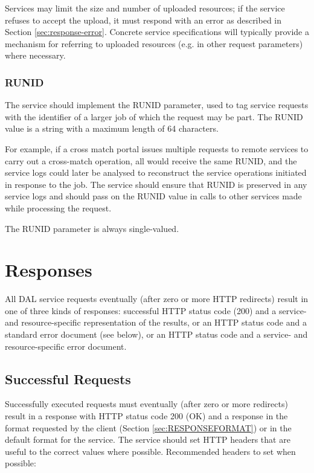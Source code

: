\documentclass[11pt,letter]{ivoa}
\begin{document}
Services may limit the size and number of uploaded resources; if the service 
refuses to accept the upload, it must respond with an error as described in 
Section \ref{sec:response-error}. Concrete service specifications will 
typically provide a mechanism for referring to uploaded resources (e.g. in 
other request parameters) where necessary.

\subsubsection{RUNID}
\label{sec:RUNID}
The service should implement the RUNID parameter, used to tag service requests 
with the identifier of a larger job of which the request may be part. The RUNID 
value is a string with a maximum length of 64 characters.

For example, if a cross match portal issues multiple requests to remote services 
to carry out a cross-match operation, all would receive the same RUNID, and the 
service logs could later be analysed to reconstruct the service operations 
initiated in response to the job. The service should ensure that RUNID is 
preserved in any service logs and  should pass on the RUNID value in calls to 
other services made while processing the request.

The RUNID parameter is always single-valued.

\section{Responses}
\label{sec:responses}
All DAL service requests eventually (after zero or more HTTP redirects) result 
in one of three kinds of responses: 
successful HTTP status code (200) and a service- and resource-specific 
representation of the results, or an HTTP status code and a standard error 
document (see below), or an HTTP status code and a service- and 
resource-specific error document.

\subsection{Successful Requests}
\label{sec:response-ok}
Successfully executed requests must eventually (after zero or more redirects) 
result in a response with HTTP status code 200 (OK) and a response in the format 
requested by the client (Section \ref{sec:RESPONSEFORMAT}) or in the default format for the 
service. The service should set HTTP headers \citep{std:HTTP} that are useful to the correct values 
where possible. Recommended headers to set when possible:
\end{document}
